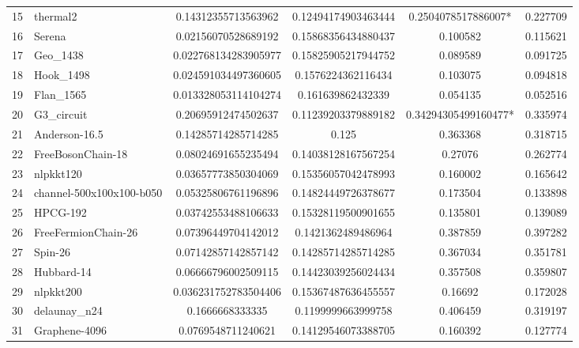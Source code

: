 \begin{tabular}{|l|l|S[round-mode=places,round-precision=4]|S[round-mode=places,round-precision=4]|S[round-mode=places,round-precision=4]|S[round-mode=places,round-precision=4]|}
{15}& {	thermal2                  }	& 0.14312355713563962	& 0.12494174903463444	& 0.2504078517886007*	& 0.227709	\\
{16}& {	Serena                    }	& 0.02156070528689192	& 0.15868356434880437	& 0.100582	& 0.115621	\\
{17}& {	Geo\_1438                  }	& 0.022768134283905977	& 0.15825905217944752	& 0.089589	& 0.091725	\\
{18}& {	Hook\_1498                 }	& 0.024591034497360605	& 0.1576224362116434	& 0.103075	& 0.094818	\\
{19}& {	Flan\_1565                 }	& 0.013328053114104274	& 0.161639862432339	& 0.054135	& 0.052516	\\
{20}& {	G3\_circuit                }	& 0.20695912474502637	& 0.11239203379889182	& 0.34294305499160477*	& 0.335974	\\
{21}& {	Anderson-16.5             }	& 0.14285714285714285	& 0.125	& 0.363368	& 0.318715	\\
{22}& {	FreeBosonChain-18         }	& 0.08024691655235494	& 0.14038128167567254	& 0.27076	& 0.262774	\\
{23}& {	nlpkkt120                 }	& 0.03657773850304069	& 0.15356057042478993	& 0.160002	& 0.165642	\\
{24}& {	channel-500x100x100-b050  }	& 0.05325806761196896	& 0.14824449726378677	& 0.173504	& 0.133898	\\
{25}& {	HPCG-192                  }	& 0.03742553488106633	& 0.15328119500901655	& 0.135801	& 0.139089	\\
{26}& {	FreeFermionChain-26       }	& 0.07396449704142012	& 0.1421362489486964	& 0.387859	& 0.397282	\\
{27}& {	Spin-26                   }	& 0.07142857142857142	& 0.14285714285714285	& 0.367034	& 0.351781	\\
{28}& {	Hubbard-14                }	& 0.06666796002509115	& 0.14423039256024434	& 0.357508	& 0.359807	\\
{29}& {	nlpkkt200                 }	& 0.036231752783504406	& 0.15367487636455557	& 0.16692	& 0.172028	\\
{30}& {	delaunay\_n24              }	& 0.1666668333335	& 0.1199999663999758	& 0.406459	& 0.319197	\\
{31}& {	Graphene-4096             }	& 0.0769548711240621	& 0.14129546073388705	& 0.160392	& 0.127774	\\
\bottomrule
\end{tabular}


